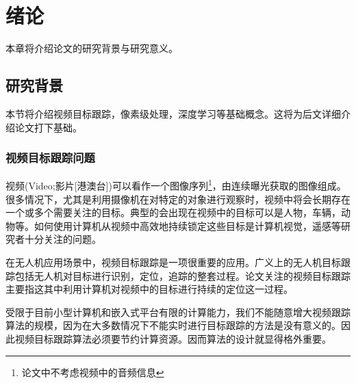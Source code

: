 
\chapter{绪论}
本章将介绍论文的研究背景与研究意义。

\section{研究背景}
本节将介绍视频目标跟踪，像素级处理，深度学习等基础概念。这将为后文详细介绍论文打下基础。

\subsection{视频目标跟踪问题}
视频(Video;影片[港澳台])可以看作一个图像序列\footnote{论文中不考虑视频中的音频信息}，由连续曝光获取的图像组成。很多情况下，尤其是利用摄像机在对特定的对象进行观察时，视频中将会长期存在一个或多个需要关注的目标。典型的会出现在视频中的目标可以是人物，车辆，动物等。如何使用计算机从视频中高效地持续锁定这些目标是计算机视觉，遥感等研究者十分关注的问题。
\par
在无人机应用场景中，视频目标跟踪是一项很重要的应用。广义上的无人机目标跟踪包括无人机对目标进行识别，定位，追踪的整套过程。论文关注的视频目标跟踪主要指这其中利用计算机对视频中的目标进行持续的定位这一过程。
\par
受限于目前小型计算机和嵌入式平台有限的计算能力，我们不能随意增大视频跟踪算法的规模，因为在大多数情况下不能实时进行目标跟踪的方法是没有意义的。因此视频目标跟踪算法必须要节约计算资源。因而算法的设计就显得格外重要。

